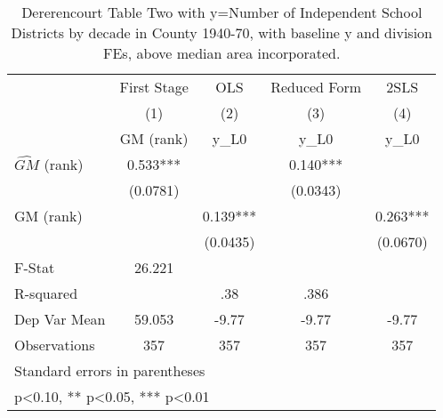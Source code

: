 \begin{table}[htbp]\centering
\def\sym#1{\ifmmode^{#1}\else\(^{#1}\)\fi}
\caption{Dererencourt Table Two with y=Number of Independent School Districts by decade in County 1940-70, with baseline y and division FEs, above median area incorporated.}
\begin{tabular}{l*{4}{c}}
\toprule
                    & First Stage   &         OLS   &Reduced Form   &        2SLS   \\
                    &\multicolumn{1}{c}{(1)}&\multicolumn{1}{c}{(2)}&\multicolumn{1}{c}{(3)}&\multicolumn{1}{c}{(4)}\\
                    &\multicolumn{1}{c}{GM  (rank)}&\multicolumn{1}{c}{y\_L0}&\multicolumn{1}{c}{y\_L0}&\multicolumn{1}{c}{y\_L0}\\
\midrule
$\hat{GM}$ (rank)   &       0.533***&               &       0.140***&               \\
                    &    (0.0781)   &               &    (0.0343)   &               \\
\addlinespace
GM  (rank)          &               &       0.139***&               &       0.263***\\
                    &               &    (0.0435)   &               &    (0.0670)   \\
\midrule
F-Stat              &      26.221   &               &               &               \\
R-squared           &               &         .38   &        .386   &               \\
Dep Var Mean        &      59.053   &       -9.77   &       -9.77   &       -9.77   \\
Observations        &         357   &         357   &         357   &         357   \\
\bottomrule
\multicolumn{5}{l}{\footnotesize Standard errors in parentheses}\\
\multicolumn{5}{l}{\footnotesize * p<0.10, ** p<0.05, *** p<0.01}\\
\end{tabular}
\end{table}
